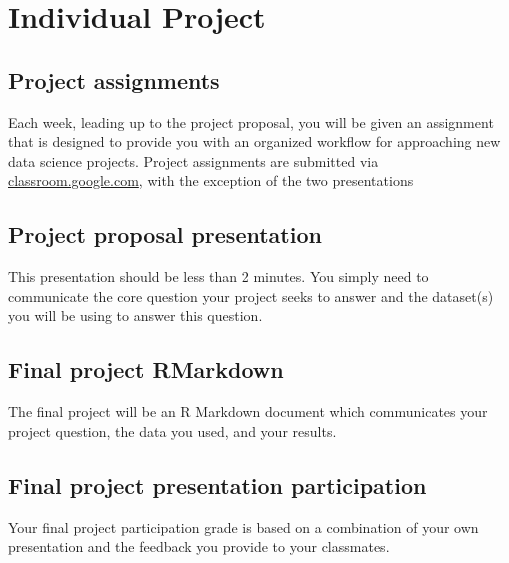\documentclass[]{book}
\theoremstyle{definition}
\theoremstyle{definition}
\theoremstyle{remark}
\begin{document}
\chapter*{Individual Project}\label{individual-project-1}

\section*{Project assignments}\label{project-assignments}

Each week, leading up to the project proposal, you will be given an
assignment that is designed to provide you with an organized workflow
for approaching new data science projects. Project assignments are
submitted via \href{https//classroom.google.com}{classroom.google.com},
with the exception of the two presentations

\section*{Project proposal
presentation}\label{project-proposal-presentation}

This presentation should be less than 2 minutes. You simply need to
communicate the core question your project seeks to answer and the
dataset(s) you will be using to answer this question.

\section*{Final project RMarkdown}\label{final-project-rmarkdown}

The final project will be an R Markdown document which communicates your
project question, the data you used, and your results.

\section*{Final project presentation
participation}\label{final-project-presentation-participation}

Your final project participation grade is based on a combination of your
own presentation and the feedback you provide to your classmates.
\end{document}
